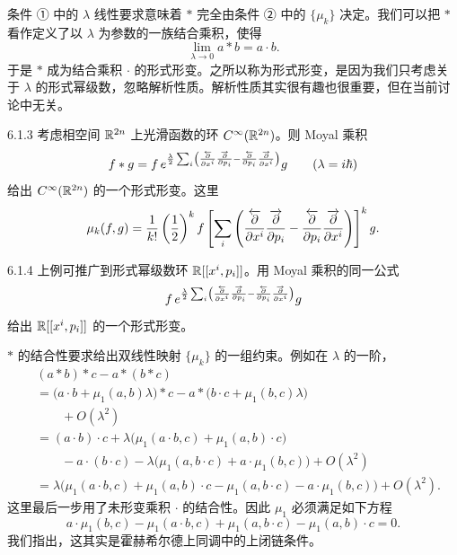 条件 ① 中的 $\lambda$ 线性要求意味着 $*$ 完全由条件 ② 中的 $\{\mu_k\}$ 决定。我们可以把 $*$ 看作定义了以 $\lambda$ 为参数的一族结合乘积，使得
\[
\lim_{\lambda\to0}a*b=a\cdot b.
\]
于是 $*$ 成为结合乘积 $\cdot$ 的形式形变。之所以称为形式形变，是因为我们只考虑关于 $\lambda$ 的形式幂级数，忽略解析性质。解析性质其实很有趣也很重要，但在当前讨论中无关。

\begin{example}{6.1.3}
  考虑相空间 $\mathbb{R}^{2n}$ 上光滑函数的环 $C^\infty(\mathbb{R}^{2n})$。则 Moyal 乘积
  \[
  f*g=f\,e^{\frac{\lambda}{2}\sum_i\left(
  \frac{\overleftarrow{\partial}}{\partial x^i}\frac{\overrightarrow{\partial}}{\partial p_i}
  -\frac{\overleftarrow{\partial}}{\partial p_i}\frac{\overrightarrow{\partial}}{\partial x^i}\right)}g
  \qquad(\lambda=i\hbar)
  \]
  给出 $C^\infty(\mathbb{R}^{2n})$ 的一个形式形变。这里
  \[
  \mu_k(f,g)=\frac{1}{k!}\left(\frac{1}{2}\right)^k
  f\left[\sum_i\left(
  \frac{\overleftarrow{\partial}}{\partial x^i}\frac{\overrightarrow{\partial}}{\partial p_i}
  -\frac{\overleftarrow{\partial}}{\partial p_i}\frac{\overrightarrow{\partial}}{\partial x^i}\right)\right]^k g.
  \]
\end{example}

\begin{example}{6.1.4}
  上例可推广到形式幂级数环 $\mathbb{R}[[x^i,p_i]]$。用 Moyal 乘积的同一公式
  \[
  f\,e^{\frac{\lambda}{2}\sum_i\left(
  \frac{\overleftarrow{\partial}}{\partial x^i}\frac{\overrightarrow{\partial}}{\partial p_i}
  -\frac{\overleftarrow{\partial}}{\partial p_i}\frac{\overrightarrow{\partial}}{\partial x^i}\right)}g
  \]
  给出 $\mathbb{R}[[x^i,p_i]]$ 的一个形式形变。
\end{example}

$*$ 的结合性要求给出双线性映射 $\{\mu_k\}$ 的一组约束。例如在 $\lambda$ 的一阶，
\[
\begin{aligned}
&(a*b)*c-a*(b*c)\\
&=\big(a\cdot b+\mu_1(a,b)\lambda\big)*c-a*\big(b\cdot c+\mu_1(b,c)\lambda\big)\\
&\qquad+O(\lambda^2)\\
&=(a\cdot b)\cdot c+\lambda\big(\mu_1(a\cdot b,c)+\mu_1(a,b)\cdot c\big)\\
&\qquad-a\cdot(b\cdot c)-\lambda\big(\mu_1(a,b\cdot c)+a\cdot\mu_1(b,c)\big)+O(\lambda^2)\\
&=\lambda\big(\mu_1(a\cdot b,c)+\mu_1(a,b)\cdot c-\mu_1(a,b\cdot c)-a\cdot\mu_1(b,c)\big)+O(\lambda^2).
\end{aligned}
\]
这里最后一步用了未形变乘积 $\cdot$ 的结合性。因此 $\mu_1$ 必须满足如下方程
\[
a\cdot\mu_1(b,c)-\mu_1(a\cdot b,c)+\mu_1(a,b\cdot c)-\mu_1(a,b)\cdot c=0.
\]
我们指出，这其实是霍赫希尔德上同调中的上闭链条件。


